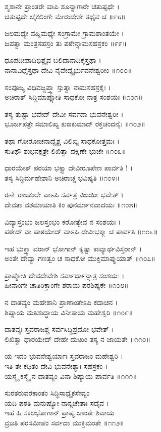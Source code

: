 ಶ್ಮಶಾನೇ ಪ್ರಾಂತರೇ ವಾಪಿ ಶೂನ್ಯಾಗಾರೇ ಚತುಷ್ಪಥೇ ।\\
ಚತುಷ್ಪಥೇ ಚೈಕಲಿಂಗೇ ಮೇರುದೇಶೇ ತಥೈವ ಚ ॥೯೮॥

ಜಲಮಧ್ಯೇ ವಹ್ನಿಮಧ್ಯೇ ಸಂಗ್ರಾಮೇ ಗ್ರಾಮಶಾಂತಯೇ ।\\
ಜಪತ್ವಾ ಮಂತ್ರಸಹಸ್ರಂ ತು ಪಠೇನ್ನಾಮಸಹಸ್ರಕಂ ॥೯೯॥

ಧೂಪದೀಪಾದಿಭಿಶ್ಚೈವ ಬಲಿದಾನಾದಿಕೈಸ್ತಥಾ ।\\
ನಾನಾವಿಧೈಸ್ತಥಾ ದೇವಿ ನೈವೇದ್ಯೈರ್ಭುವನೇಶ್ವರೀಂ ॥೧೦೦॥

ಸಂಪೂಜ್ಯ ವಿಧಿವಜ್ಜಪ್ತ್ವಾ ಸ್ತುತ್ವಾ ನಾಮಸಹಸ್ರಕೈಃ ।\\
ಅಚಿರಾತ್ ಸಿದ್ಧಿಮಾಪ್ನೋತಿ ಸಾಧಕೋ ನಾತ್ರ ಸಂಶಯಃ ॥೧೦೧॥

ತಸ್ಯ ತುಷ್ಟಾ ಭವೇದ್ ದೇವೀ ಸರ್ವದಾ ಭುವನೇಶ್ವರೀ ।\\
ಭೂರ್ಜಪತ್ರೇ ಸಮಾಲಿಖ್ಯ ಕುಙಕುಮಾದ್ ರಕ್ತಚಂದನೈಃ ॥೧೦೨॥

ತಥಾ ಗೋರೋಚನಾದ್ಯೈಶ್ಚ ವಿಲಿಖ್ಯ ಸಾಧಕೋತ್ತಮಃ ।\\
ಸುತಿಥೌ ಶುಭನಕ್ಷತ್ರೇ ಲಿಖಿತ್ವಾ ದಕ್ಷಿಣೇ ಭುಜೇ ॥೧೦೩॥

ಧಾರಯೇತ್ ಪರಯಾ ಭಕ್ತ್ಯಾ ದೇವೀರೂಪೇಣ ಪಾರ್ವತಿ ! ।\\
ತಸ್ಯ ಸಿದ್ಧಿರ್ಮಹೇಶಾನಿ ಅಚಿರಾಚ್ಚ ಭವಿಷ್ಯತಿ ॥೧೦೪॥

ರಣೇ ರಾಜಕುಲೇ ವಾಽಪಿ ಸರ್ವತ್ರ ವಿಜಯೀ ಭವೇತ್ ।\\
ದೇವತಾ ವಶಮಾಯಾತಿ ಕಿಂ ಪುನರ್ಮಾನವಾದಯಃ ॥೧೦೫॥

ವಿದ್ಯಾಸ್ತಂಭಂ ಜಲಸ್ತಂಭಂ ಕರೋತ್ಯೇವ ನ ಸಂಶಯಃ ।\\
ಪಠೇದ್ ವಾ ಪಾಠಯೇದ್ ವಾಽಪಿ ದೇವೀಭಕ್ತ್ಯಾ ಚ ಪಾರ್ವತಿ ॥೧೦೬॥

ಇಹ ಭುಕ್ತ್ವಾ ವರಾನ್ ಭೋಗಾನ್ ಕೃತ್ವಾ ಕಾವ್ಯಾರ್ಥವಿಸ್ತರಾನ್ ।\\
ಅಂತೇ ದೇವ್ಯಾ ಗಣತ್ವಂ ಚ ಸಾಧಕೋ ಮುಕ್ತಿಮಾಪ್ನುಯಾತ್ ॥೧೦೭॥

ಪ್ರಾಪ್ನೋತಿ ದೇವದೇವೇಶಿ ಸರ್ವಾರ್ಥಾನ್ನಾತ್ರ ಸಂಶಯಃ ।\\
ಹೀನಾಂಗೇ ಚಾತಿರಿಕ್ತಾಂಗೇ ಶಠಾಯ ಪರಶಿಷ್ಯಕೇ ॥೧೦೮॥

ನ ದಾತವ್ಯಂ ಮಹೇಶಾನಿ ಪ್ರಾಣಾಂತೇಽಪಿ ಕದಾಚನ ।\\
ಶಿಷ್ಯಾಯ ಮತಿಶುದ್ಧಾಯ ವಿನೀತಾಯ ಮಹೇಶ್ವರಿ ॥೧೦೯॥

ದಾತವ್ಯಃ ಸ್ತವರಾಜಶ್ಚ ಸರ್ವಸಿದ್ಧಿಪ್ರದೋ ಭವೇತ್ ।\\
ಲಿಖಿತ್ವಾ ಧಾರಯೇದ್ ದೇಹೇ ದುಃಖಂ ತಸ್ಯ ನ ಜಾಯತೇ ॥೧೧೦॥

ಯ ಇದಂ ಭುವನೇಶ್ವರ್ಯಾಃ ಸ್ತವರಾಜಂ ಮಹೇಶ್ವರಿ ।\\
ಇತಿ ತೇ ಕಥಿತಂ ದೇವಿ ಭುವನೇಶ್ಯಾಃ ಸಹಸ್ರಕಂ ।\\
ಯಸ್ಮೈ ಕಸ್ಮೈ ನ ದಾತವ್ಯಂ ವಿನಾ ಶಿಷ್ಯಾಯ ಪಾರ್ವತಿ  ॥೧೧೧॥

ಸುರತರುವರಕಾಂತಂ ಸಿದ್ಧಿಸಾಧ್ಯೈಕಸೇವ್ಯಂ\\
ಯದಿ ಪಠತಿ ಮನುಷ್ಯೋ ನಾನ್ಯಚೇತಾಃ ಸದೈವ ।\\
ಇಹ ಹಿ ಸಕಲಭೋಗಾನ್ ಪ್ರಾಪ್ಯ ಚಾಂತೇ ಶಿವಾಯ\\
ವ್ರಜತಿ ಪರಸಮೀಪಂ ಸರ್ವದಾ ಮುಕ್ತಿಮಂತೇ ॥೧೧೨॥

